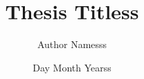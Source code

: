 \documentclass[12pt]{article}
\title{Thesis Titless}
\author{Author Namesss}
\date{Day Month Yearss}
\begin{document}

\clearpage


\clearpage

\tableofcontents
\clearpage

\let\LaTeXStandardClearpage\clearpage
\let\clearpage\relax  %
\listoffigures
\listofsuppfigures
\let\clearpage\LaTeXStandardClearpage %
\listoftables
\clearpage


\clearpage






\clearpage


\clearpage


\clearpage

\printbibliography
\end{document}
